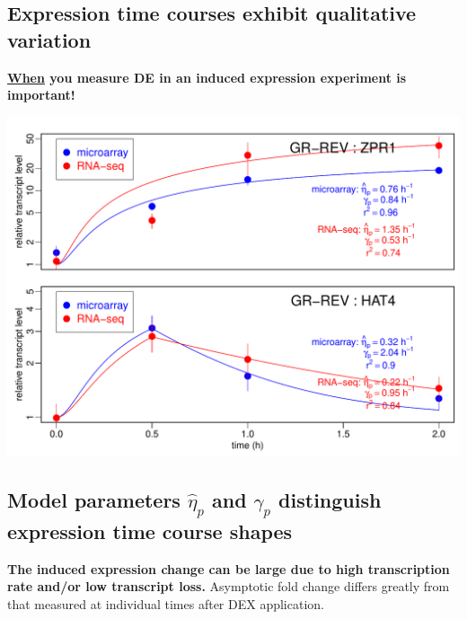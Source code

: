 \documentclass[aspb,landscape]{a0poster}
\newlength{\figwidth}
\begin{document}
\begin{multicols}{4}
  
  \subsection*{Expression time courses exhibit qualitative variation}

  \textbf{\underline{When} you measure DE in an induced expression experiment is important!}
  
  \begin{minipage}[t]{1.0\linewidth}
    \includegraphics[width=\figwidth]{ZPR1-HAT4}
  \end{minipage}

  \subsection*{Model parameters $\hat{\eta}_p$ and $\gamma_p$ distinguish expression time course shapes}

  \textbf{The induced expression change can be large due to high transcription rate and/or low transcript loss.}
  Asymptotic fold change differs greatly from that measured at individual times after DEX application.
  

\end{multicols}
\end{document}
